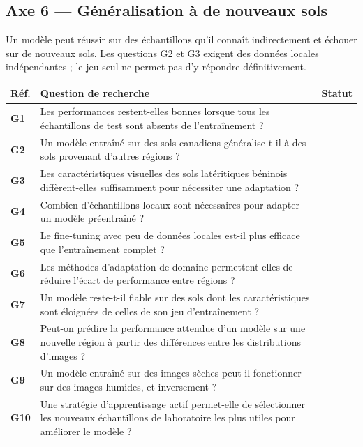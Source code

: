 \documentclass[11pt,a4paper]{article}
\makeatletter
\newenvironment{qtable}{%
  \par\smallskip
  \begin{longtable}{@{}>{\bfseries}p{1.0cm} p{12.3cm} p{1.5cm}@{}}
  \toprule
  \textbf{Réf.} & \textbf{Question de recherche} & \textbf{Statut}\\
  \midrule
  \endhead
}{%
  \bottomrule
  \end{longtable}
}
\makeatother
\begin{document}
\subsection*{Axe 6 --- Généralisation à de nouveaux sols}
Un modèle peut réussir sur des échantillons qu'il connaît indirectement et échouer sur de nouveaux sols. Les questions G2 et G3 exigent des données locales indépendantes ; le jeu seul ne permet pas d'y répondre définitivement.
\begin{qtable}
G1 & Les performances restent-elles bonnes lorsque tous les échantillons de test sont absents de l'entraînement ? & \\
G2 & Un modèle entraîné sur des sols canadiens généralise-t-il à des sols provenant d'autres régions ? & \\
G3 & Les caractéristiques visuelles des sols latéritiques béninois diffèrent-elles suffisamment pour nécessiter une adaptation ? & \\
G4 & Combien d'échantillons locaux sont nécessaires pour adapter un modèle préentraîné ? & \\
G5 & Le fine-tuning avec peu de données locales est-il plus efficace que l'entraînement complet ? & \\
G6 & Les méthodes d'adaptation de domaine permettent-elles de réduire l'écart de performance entre régions ? & \\
G7 & Un modèle reste-t-il fiable sur des sols dont les caractéristiques sont éloignées de celles de son jeu d'entraînement ? & \\
G8 & Peut-on prédire la performance attendue d'un modèle sur une nouvelle région à partir des différences entre les distributions d'images ? & \\
G9 & Un modèle entraîné sur des images sèches peut-il fonctionner sur des images humides, et inversement ? & \\
G10 & Une stratégie d'apprentissage actif permet-elle de sélectionner les nouveaux échantillons de laboratoire les plus utiles pour améliorer le modèle ? & \\
\end{qtable}
\end{document}
